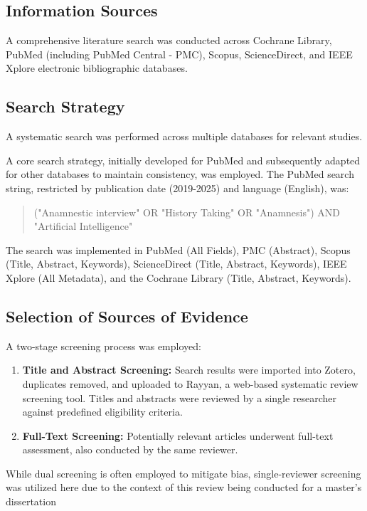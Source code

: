 \subsection{Information Sources} \label{sec:se32}

A comprehensive literature search was conducted across Cochrane Library, PubMed (including PubMed Central - PMC), Scopus, ScienceDirect, and IEEE Xplore electronic bibliographic databases.

\subsection{Search Strategy} \label{sec:se321}

A systematic search was performed across multiple data\-bases for relevant studies.

A core search strategy, initially developed for PubMed and subsequently adapted for other databases to maintain consistency, was employed. The PubMed search string, restricted by publication date (2019-2025) and language (English), was:

\begin{quote}
("Anamnestic interview" OR "History Taking" OR "Anamnesis") AND "Artificial Intelligence"
\end{quote}

The search was implemented in PubMed (All Fields), PMC (Abstract), Scopus (Title, Abstract, Keywords), ScienceDirect (Title, Abstract, Keywords), IEEE Xplore (All Metadata), and the Cochrane Library (Title, Abstract, Keywords).

\subsection{Selection of Sources of Evidence} \label{sec:se322}

A two-stage screening process was employed:

\begin{enumerate}
    \item \textbf{Title and Abstract Screening:} Search results were imported into Zotero, duplicates removed, and uploaded to Rayyan, a web-based systematic review screening tool. Titles and abstracts were reviewed by a single researcher against predefined eligibility criteria.
    \item \textbf{Full-Text Screening:} Potentially relevant articles underwent full-text assessment, also conducted by the same reviewer.
\end{enumerate}
 While dual screening is often employed to mitigate bias, single-reviewer screening was utilized here due to the context of this review being conducted for a master's dissertation

